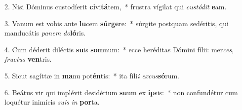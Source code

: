 2. Nisi Dóminus custodíerit \textbf{ci}vi\textbf{tá}tem,~*  frustra vígilat qui \textit{cus}\textit{tó}\textit{dit} \textbf{e}am.\

3. Vanum est vobis ante \textbf{lu}cem \textbf{súr}\textbf{ge}re:~*  súrgite postquam sedéritis, qui manducátis \textit{pa}\textit{nem} \textit{do}\textbf{ló}ris.\

4. Cum déderit diléctis \textbf{su}is \textbf{som}num:~*  ecce heréditas Dómini fílii: mer\textit{ces}, \textit{fruc}\textit{tus} \textbf{ven}tris.\

5. Sicut sagíttæ in \textbf{ma}nu pot\textbf{én}tis:~*  ita fíli\textit{i} \textit{ex}\textit{cus}\textbf{só}rum.\

6. Beátus vir qui implévit desidérium \textbf{su}um ex \textbf{ip}sis:~*  non confundétur cum loquétur inimícis \textit{su}\textit{is} \textit{in} \textbf{por}ta.\

